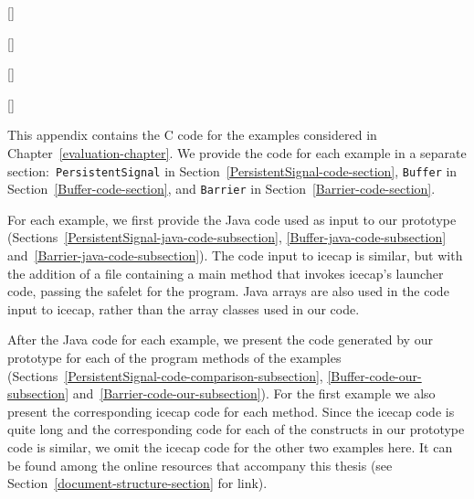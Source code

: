 \renewcommand\#{\char"0023}

[]
[]
[]
[]


This appendix contains the C code for the examples considered in
Chapter~\ref{evaluation-chapter}.
We provide the code for each example in a separate
section:~\texttt{PersistentSignal} in
Section~\ref{PersistentSignal-code-section}, \texttt{Buffer} in
Section~\ref{Buffer-code-section}, and \texttt{Barrier} in
Section~\ref{Barrier-code-section}.

For each example, we first provide the Java code used as input to our
prototype (Sections~\ref{PersistentSignal-java-code-subsection},
\ref{Buffer-java-code-subsection}
and~\ref{Barrier-java-code-subsection}).
The code input to icecap is similar, but with the addition of a file
containing a main method that invokes icecap's launcher code, passing
the safelet for the program.
Java arrays are also used in the code input to icecap, rather than the
array classes used in our code.

After the Java code for each example, we present the code generated by
our prototype for each of the program methods of the examples
(Sections~\ref{PersistentSignal-code-comparison-subsection},
\ref{Buffer-code-our-subsection}
and~\ref{Barrier-code-our-subsection}).
For the first example we also present the corresponding icecap code
for each method.
Since the icecap code is quite long and the corresponding code for
each of the constructs in our prototype code is similar, we omit the
icecap code for the other two examples here.
It can be found among the online resources that accompany this thesis
(see Section~\ref{document-structure-section} for link).

